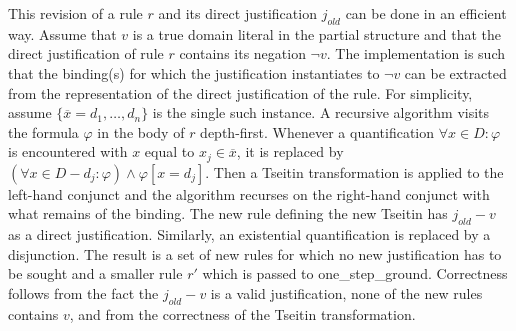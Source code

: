 \documentclass[11pt]{article}
\newcommand{\m}[1]{\ensuremath{#1}\xspace}
\newcommand{\f}{\m{\varphi}}
\newcommand{\xxx}{\m{\overline{x}}}
\newcommand{\typed}[2]{\m{#1\in #2:}}
\theoremstyle{plain}
\theoremstyle{definition}
\theoremstyle{example_basic}
\theoremstyle{example_contd}
\theoremstyle{plain}
\newcommand{\groundone}{\textsf{one\_step\_ground}\xspace}
\newcommand{\change}[1]{#1}
\begin{document}
\change{This revision of a rule $r$ and its direct justification $j_{old}$ can be
  done in an efficient way.  Assume that $v$ is a true domain literal
  in the partial structure and that the direct justification of rule
  $r$ contains its negation $\lnot v$. The implementation is such
  that the binding(s) for which the
  justification instantiates to $\lnot v$ can be extracted from the
  representation of the direct justification of the rule. For
  simplicity, assume $\{\xxx=d_1, \ldots, d_n\}$ is the
  single such instance. A recursive algorithm visits the formula \f in
  the body of $r$ depth-first. Whenever a quantification $\forall
  \typed{x}{D} \f$ is encountered with $x$ equal to $x_j\in \xxx$, it
  is replaced by $(\forall \typed{x}{D-d_j} \f) \land \f[x=d_j]$. Then
  a Tseitin transformation is applied to the left-hand conjunct and
  the algorithm recurses on the right-hand conjunct with what remains
  of the binding. The new rule defining the new Tseitin has
  $j_{old}-v$ as a direct justification. Similarly, an existential
  quantification is replaced by a disjunction.  }
The result is a set of new rules for which no new justification has to
be sought and a smaller rule $r'$ which is passed to
\groundone. Correctness follows from the fact the $j_{old}-v$ is a
valid justification, none of the new rules contains $v$, and from the
correctness of the Tseitin transformation. 
\end{document}

